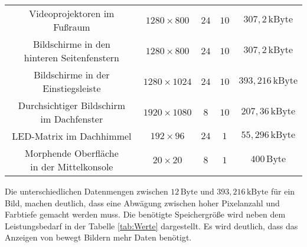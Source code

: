 \begin{table}[hbt]
\begin{tabular}{c|cccc}
		\parbox[t]{0.3\linewidth}{\centering Videoprojektoren im Fußraum} & $ 1280 \times 800 $ & $ 24 $ & $ 10 $ & $ 307,2\,\mathrm{kByte} $ \\
		\parbox[t]{0.3\linewidth}{\centering Bildschirme in den\\hinteren Seitenfenstern} & $ 1280 \times 800 $ & $ 24 $ & $ 10 $ & $ 307,2\,\mathrm{kByte} $ \\
		\parbox[t]{0.3\linewidth}{\centering Bildschirme in der Einstiegsleiste} &  $ 1280 \times 1024 $ & $ 24 $ & $ 10 $ & $ 393,216\,\mathrm{kByte} $ \\
		\parbox[t]{0.3\linewidth}{\centering Durchsichtiger Bildschirm\\im Dachfenster} & $ 1920 \times 1080 $ & $ 8 $ & $ 10 $ & $ 207,36\,\mathrm{kByte} $ \\
		\parbox[t]{0.3\linewidth}{\centering LED-Matrix im Dachhimmel} & $ 192 \times 96 $ & $ 24 $ & $ 1 $ & $ 55,296\,\mathrm{kByte} $ \\
		\parbox[t]{0.3\linewidth}{\centering Morphende Oberfläche\\in der Mittelkonsole} & $ 20 \times 20 $ & $ 8 $ & $ 1 $ & $ 400\,\mathrm{Byte} $ \\
	\end{tabular} 
\end{table}
Die unterschiedlichen Datenmengen zwischen $ 12\,\mathrm{Byte} $ und $ 393,216\,\mathrm{kByte} $ für ein Bild, machen deutlich, dass eine Abwägung zwischen hoher Pixelanzahl und Farbtiefe gemacht werden muss. Die benötigte Speichergröße wird neben dem Leistungsbedarf in der Tabelle \ref{tab:Werte} dargestellt. Es wird deutlich, dass das Anzeigen von bewegt Bildern mehr Daten benötigt.
